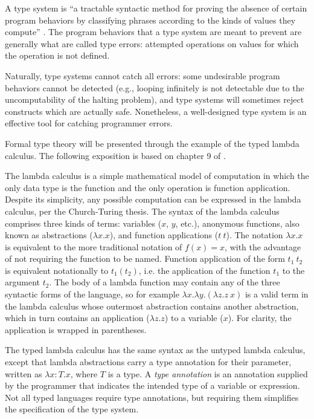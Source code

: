 \documentclass{article}
\begin{document}
A type system is ``a tractable syntactic method for proving the absence of certain program behaviors by classifying phrases according to the kinds of values they compute'' \cite{types}. The program behaviors that a type system are meant to prevent are generally what are called type errors: attempted operations on values for which the operation is not defined.

Naturally, type systems cannot catch all errors: some undesirable program behaviors cannot be detected (e.g., looping infinitely is not detectable due to the uncomputability of the halting problem), and type systems will sometimes reject constructs which are actually safe. Nonetheless, a well-designed type system is an effective tool for catching programmer errors.

Formal type theory will be presented through the example of the typed lambda calculus. The following exposition is based on chapter 9 of \cite{types}.

The lambda calculus is a simple mathematical model of computation in which the only data type is the function and the only operation is function application. Despite its simplicity, any possible computation can be expressed in the lambda calculus, per the Church-Turing thesis. The syntax of the lambda calculus comprises three kinds of terms: variables ($x$, $y$, etc.), anonymous functions, also known as abstractions ($\lambda x . x$), and function applications ($t\ t$). The notation $\lambda x . x$ is equivalent to the more traditional notation of $f(x) = x$, with the advantage of not requiring the function to be named. Function application of the form $t_1\ t_2$ is equivalent notationally to $t_1(t_2)$, i.e. the application of the function $t_1$ to the argument $t_2$. The body of a lambda function may contain any of the three syntactic forms of the language, so for example $\lambda x . \lambda y . (\lambda z . z\ x)$ is a valid term in the lambda calculus whose outermost abstraction contains another abstraction, which in turn contains an application ($\lambda z . z$) to a variable ($x$). For clarity, the application is wrapped in parentheses.

The typed lambda calculus has the same syntax as the untyped lambda calculus, except that lambda abstractions carry a type annotation for their parameter, written as $\lambda x: T . x$, where $T$ is a type. A \textit{type annotation} is an annotation supplied by the programmer that indicates the intended type of a variable or expression. Not all typed languages require type annotations, but requiring them simplifies the specification of the type system.
\end{document}
